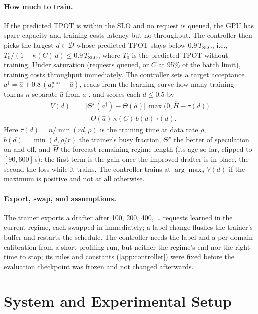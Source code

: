 \documentclass{article}
\newcommand{\amax}{a^{\max}}
\newcommand{\Tslo}{T_{\mathrm{SLO}}}
\begin{document}
\paragraph{How much to train.} If the predicted TPOT is within the SLO and no request is queued, the GPU has spare capacity and training costs latency but no throughput. The controller then picks the largest $d\in\mathcal D$ whose predicted TPOT stays below $0.9\,\Tslo$, i.e., $T_0/(1-\kappa(C)\,d)\le0.9\,\Tslo$, where $T_0$ is the predicted TPOT without training. Under saturation (requests queued, or $C$ at 95\% of the batch limit), training costs throughput immediately. The controller sets a target acceptance $a^{\dagger}=\hat a+0.8\,(\amax_\ell-\hat a)$, reads from the learning curve how many training tokens $n$ separate $\hat a$ from $a^{\dagger}$, and scores each $d\le0.5$ by
\begin{equation}
\begin{aligned}
V(d)={}&\big[\Theta^{\star}(a^{\dagger})-\Theta(\hat a)\big]\,\max\!\big(0,\widehat H-\tau(d)\big)\\
&-\Theta(\hat a)\,\kappa(C)\,b(d)\,\tau(d).
\end{aligned}\label{eq:value}
\end{equation}
Here $\tau(d)=n/\min(rd,\rho)$ is the training time at data rate $\rho$, $b(d)=\min(d,\rho/r)$ the trainer's busy fraction, $\Theta^{\star}$ the better of speculation on and off, and $\widehat H$ the forecast remaining regime length (its age so far, clipped to $[90,600]$\,s): the first term is the gain once the improved drafter is in place, the second the loss while it trains. The controller trains at $\arg\max_d V(d)$ if the maximum is positive and not at all otherwise.

\paragraph{Export, swap, and assumptions.} The trainer exports a drafter after 100, 200, 400, \dots{} requests learned in the current regime, each swapped in immediately; a label change flushes the trainer's buffer and restarts the schedule. The controller needs the label and a per-domain calibration from a short profiling run, but neither the regime's end nor the right time to stop; its rules and constants (\cref{app:controller}) were fixed before the evaluation checkpoint was frozen and not changed afterwards.

\section{System and Experimental Setup}\label{sec:system}
\end{document}
